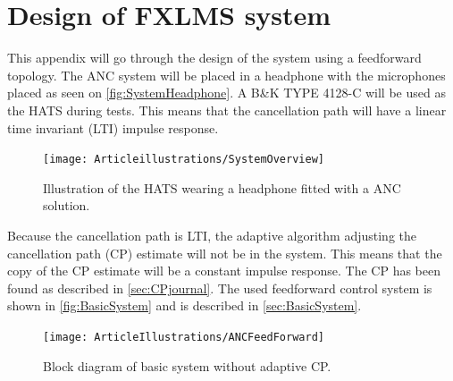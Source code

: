 \section{Design of FXLMS system} \label{sec:systemDesign}
This appendix will go through the design of the system using a feedforward topology. The ANC system will be placed in a headphone with the microphones placed as seen on \autoref{fig:SystemHeadphone}. A B\&K TYPE 4128-C will be used as the HATS during tests. This means that the cancellation path will have a linear time invariant (LTI) impulse response. 



\begin{figure}[H]
	\centering
	\texttt{[image: Articleillustrations/SystemOverview]}
	\caption{Illustration of the HATS wearing a headphone fitted with a ANC solution.}
	\label{fig:SystemHeadphone}
\end{figure}  

Because the cancellation path is LTI, the adaptive algorithm adjusting the cancellation path (CP) estimate will not be in the system. This means that the copy of the CP estimate will be a constant impulse response. The CP has been found as described in \autoref{sec:CPjournal}. The used feedforward control system is shown in \autoref{fig:BasicSystem} and is described in \autoref{sec:BasicSystem}. 

\begin{figure}[H]
	\centering
	\texttt{[image: ArticleIllustrations/ANCFeedForward]}
	\caption{Block diagram of basic system without adaptive CP.}
	\label{fig:BasicSystem}
\end{figure}   




